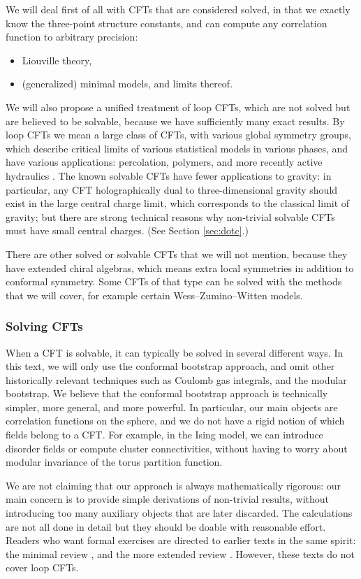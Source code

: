 \documentclass[12pt, a4paper]{article}
\theoremstyle{break}
\begin{document}
We will deal first of all with CFTs that are considered solved, in that we exactly know the three-point structure constants, and can compute any correlation function to arbitrary precision:
\begin{itemize}
 \item Liouville theory,
 \item (generalized) minimal models, and limits thereof. 
\end{itemize}
We will also propose a unified treatment of loop CFTs, which are not solved but are believed to be solvable, because we have sufficiently many exact results. By loop CFTs we mean a large class of CFTs, with various global symmetry groups, which describe critical limits of various statistical models in various phases, and have various applications: percolation, polymers, and more recently active hydraulics \cite{jcpb23}. 
The known solvable CFTs have fewer applications to gravity: in particular, any CFT holographically dual to three-dimensional gravity should exist in the large central charge limit, which corresponds to the classical limit of gravity; but there are strong technical reasons why non-trivial solvable CFTs must have small central charges. (See Section \ref{sec:dotc}.) 

There are other solved or solvable CFTs that we will not mention, because they have extended chiral algebras, which means extra local symmetries in addition to conformal symmetry. Some CFTs of that type can be solved with the methods that we will cover, for example certain Wess--Zumino--Witten models. 

\subsubsection*{Solving CFTs}

When a CFT is solvable, it can typically be solved in several different ways. In this text, we will only use the conformal bootstrap approach, and omit other historically relevant techniques such as Coulomb gas integrals, and the modular bootstrap. We believe that the conformal bootstrap approach is technically simpler, more general, and more powerful. In particular, our main objects are correlation functions on the sphere, and we do not have a rigid notion of which fields belong to a CFT. For example, in the Ising model, we can introduce disorder fields or compute cluster connectivities, without having to worry about modular invariance of the torus partition function. 

We are not claiming that our approach is always mathematically rigorous: our main concern is to provide simple derivations of non-trivial results, without introducing too many auxiliary objects that are later discarded. The calculations are not all done in detail but they should be doable with reasonable effort. Readers who want formal exercises are directed to earlier texts in the same spirit: the minimal review \cite{rib16}, and the more extended review \cite{rib14}. However, these texts do not cover loop CFTs.
\end{document}
